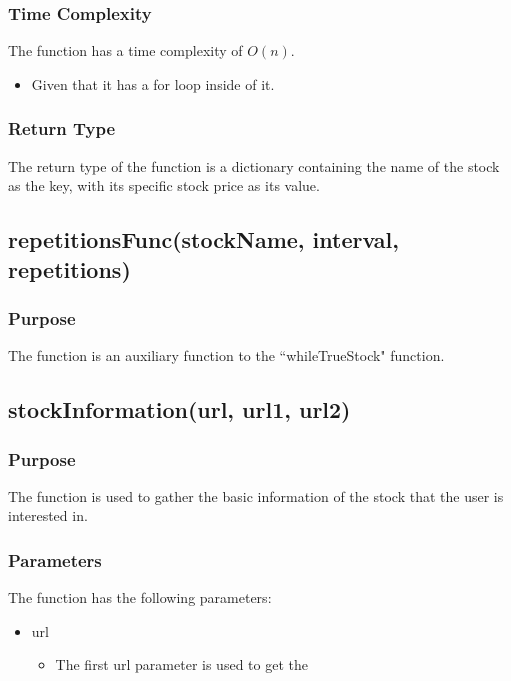\documentclass{article}
\begin{document}
			\subsubsection{Time Complexity}			
				\noindent The function has a time complexity of $O(n)$.
					\begin{itemize}
						\item Given that it has a for loop inside of it.
					\end{itemize}
			
			\subsubsection{Return Type}
				The return type of the function is a dictionary containing the name of the stock as the key, with its specific stock price as its value.
		
		\newpage
		
		\subsection{repetitionsFunc(stockName, interval, repetitions)}
			\subsubsection{Purpose}
				The function is an auxiliary function to the ``whileTrueStock" function.
				
		\newpage
		
		\subsection{stockInformation(url, url1, url2)}
			\subsubsection{Purpose}
				The function is used to gather the basic information of the stock that the user is interested in.
				
			\subsubsection{Parameters}
				The function has the following parameters:
					\begin{itemize}
						\item url
							\begin{itemize}
								\item The first url parameter is used to get the 
							\end{itemize}
					\end{itemize}
			
\end{document}
